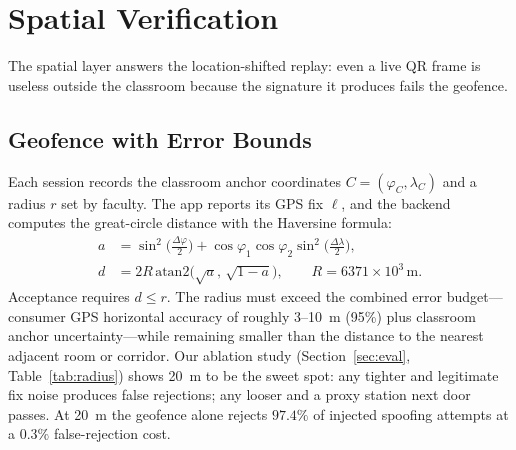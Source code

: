 \documentclass[conference]{IEEEtran}
\begin{document}
\section{Spatial Verification}
\label{sec:spatial}
The spatial layer answers the location-shifted replay: even a live QR frame
is useless outside the classroom because the signature it produces fails the
geofence.

\subsection{Geofence with Error Bounds}
Each session records the classroom anchor coordinates $C=(\varphi_C,\lambda_C)$
and a radius $r$ set by faculty. The app reports its GPS fix $\ell$, and the
backend computes the great-circle distance with the Haversine formula:
\begin{equation}\begin{split}
a &= \sin^2\!\big(\tfrac{\Delta\varphi}{2}\big) +
     \cos\varphi_1 \cos\varphi_2 \sin^2\!\big(\tfrac{\Delta\lambda}{2}\big),\\
d &= 2R\,\mathrm{atan2}\big(\sqrt{a},\,\sqrt{1-a}\big), \qquad R = 6371\times10^{3}\,\mathrm{m}.
\end{split}\end{equation}
Acceptance requires $d \le r$. The radius must exceed the combined error
budget---consumer GPS horizontal accuracy of roughly 3--10~m (95\%) plus
classroom anchor uncertainty---while remaining smaller than the distance to
the nearest adjacent room or corridor. Our ablation study
(Section~\ref{sec:eval}, Table~\ref{tab:radius}) shows 20~m to be the
sweet spot: any tighter and legitimate fix noise produces false rejections;
any looser and a proxy station next door passes. At 20~m the geofence alone
rejects $97.4\%$ of injected spoofing attempts at a $0.3\%$
false-rejection cost.
\end{document}
